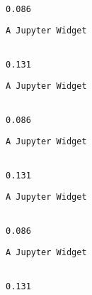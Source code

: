 \documentclass[11pt]{article}
\begin{document}
    
    \begin{Verbatim}[commandchars=\\\{\}]

0.086

    \end{Verbatim}

    
    \begin{verbatim}
A Jupyter Widget
    \end{verbatim}

    
    \begin{Verbatim}[commandchars=\\\{\}]

0.131

    \end{Verbatim}

    
    \begin{verbatim}
A Jupyter Widget
    \end{verbatim}

    
    \begin{Verbatim}[commandchars=\\\{\}]

0.086

    \end{Verbatim}

    
    \begin{verbatim}
A Jupyter Widget
    \end{verbatim}

    
    \begin{Verbatim}[commandchars=\\\{\}]

0.131

    \end{Verbatim}

    
    \begin{verbatim}
A Jupyter Widget
    \end{verbatim}

    
    \begin{Verbatim}[commandchars=\\\{\}]

0.086

    \end{Verbatim}

    
    \begin{verbatim}
A Jupyter Widget
    \end{verbatim}

    
    \begin{Verbatim}[commandchars=\\\{\}]

0.131

    \end{Verbatim}
\end{document}
